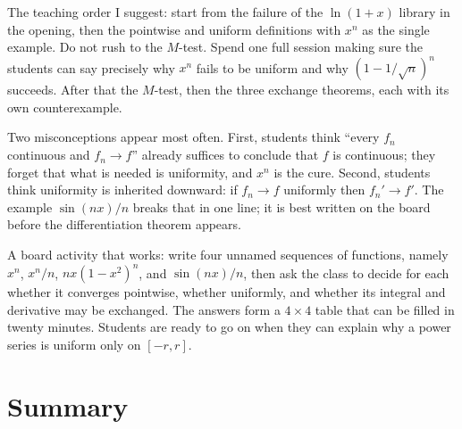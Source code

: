 \begin{untukdosen}
The teaching order I suggest: start from the failure of the $\ln(1+x)$ library in
the opening, then the pointwise and uniform definitions with $x^n$ as the single
example. Do not rush to the $M$-test. Spend one full session making sure
the students can say precisely why $x^n$ fails to be uniform
and why $(1-1/\sqrt n)^n$ succeeds. After that the $M$-test, then the three exchange
theorems, each with its own counterexample.

Two misconceptions appear most often. First, students think ``every
$f_n$ continuous and $f_n\to f$'' already suffices to conclude that $f$ is continuous; they
forget that what is needed is uniformity, and $x^n$ is the cure. Second,
students think uniformity is inherited downward: if $f_n\to f$ uniformly then
$f_n'\to f'$. The example $\sin(nx)/n$ breaks that in one line; it is best
written on the board before the differentiation theorem appears.

A board activity that works: write four unnamed sequences of functions,
namely $x^n$, $x^n/n$, $nx(1-x^2)^n$, and $\sin(nx)/n$, then ask the class
to decide for each whether it converges pointwise, whether uniformly, and
whether its integral and derivative may be exchanged. The answers form a $4\times4$ table
that can be filled in twenty minutes. Students are ready to go on when they can
explain why a power series is uniform only on $[-r,r]$.
\end{untukdosen}

\section{Summary}

